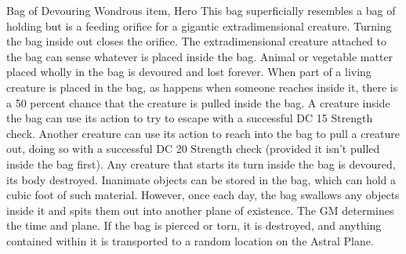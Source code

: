 Bag of Devouring
Wondrous item, Hero This bag superficially resembles a bag of holding but is a feeding orifice for a gigantic extradimensional creature. Turning the bag inside out closes the orifice.  The extradimensional creature attached to the bag can sense whatever is placed inside the bag. Animal or vegetable matter placed wholly in the bag is devoured and lost forever. When part of a living creature is placed in the bag, as happens when someone reaches inside it, there is a 50 percent chance that the creature is pulled inside the bag. A creature inside the bag can use its action to try to escape with a successful DC 15 Strength check. Another creature can use its action to reach into the bag to pull a creature out, doing so with a successful DC 20 Strength check (provided it isn't pulled inside the bag first). Any creature that starts its turn inside the bag is devoured, its body destroyed.  Inanimate objects can be stored in the bag, which can hold a cubic foot of such material. However, once each day, the bag swallows any objects inside it and spits them out into another plane of existence. The GM determines the time and plane.  If the bag is pierced or torn, it is destroyed, and anything contained within it is transported to a random location on the Astral Plane.



